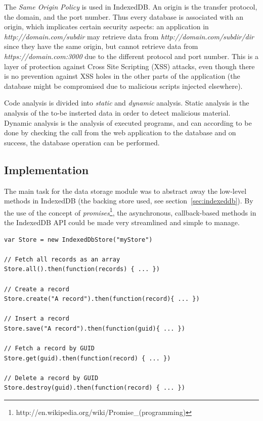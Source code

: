 The \emph{Same Origin Policy} is used in IndexedDB. An origin is the transfer protocol, the domain, and the port number. Thus every database is associated with an origin, which implicates certain security aspects: an application in \emph{http://domain.com/subdir} may retrieve data from \emph{http://domain.com/subdir/dir} since they have the same origin, but cannot retrieve data from \emph{https://domain.com:3000} due to the different protocol and port number. This is a layer of protection against Cross Site Scripting (XSS) attacks, even though there is no prevention against XSS holes in the other parts of the application (the database might be compromised due to malicious scripts injected elsewhere).

Code analysis is divided into \emph{static} and \emph{dynamic} analysis. Static analysis is the analysis of the to-be insterted data in order to detect malicious material. Dynamic analysis is the analysis of executed programs, and can according to \cite{IndexedDBSecurity:2012:Online} be done by checking the call from the web application to the database and on success, the database operation can be performed.

\subsection{Implementation}
The main task for the data storage module was to abstract away the low-level methods in IndexedDB (the backing store used, see section~\ref{sec:indexeddb}). By the use of the concept of \emph{promises}\footnote{http://en.wikipedia.org/wiki/Promise\_(programming)}, the asynchronous, callback-based methods in the IndexedDB API could be made very streamlined and simple to manage.

\begin{Code}
\begin{lstlisting}[caption=Common database operations]
var Store = new IndexedDbStore("myStore")

// Fetch all records as an array
Store.all().then(function(records) { ... })

// Create a record
Store.create("A record").then(function(record){ ... })

// Insert a record
Store.save("A record").then(function(guid){ ... })

// Fetch a record by GUID
Store.get(guid).then(function(record) { ... })

// Delete a record by GUID
Store.destroy(guid).then(function(record) { ... })
\end{lstlisting}
\end{Code}

